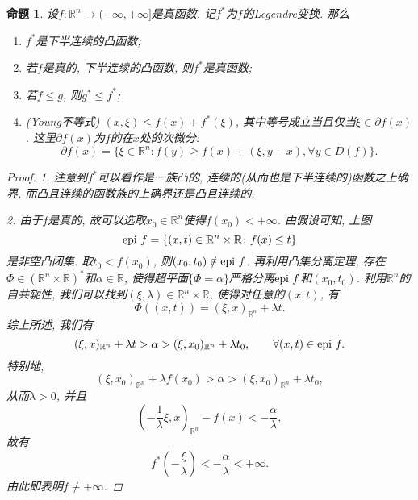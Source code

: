 \documentclass[12pt,a4paper]{article}
\newtheorem{proposition}[theorem]{命题}
\begin{document}
\begin{proposition}
    设$f\colon \mathbb{R}^n \rightarrow (-\infty, +\infty]$是真函数. 记$f^*$为$f$的Legendre变换.
    那么 
    \begin{enumerate}
        \item $f^*$是下半连续的凸函数;
        \item 若$f$是真的, 下半连续的凸函数, 则$f^*$是真函数;
        \item 若$f \leq g$, 则$g^* \leq f^*$; \label{prop2.63-3}
        \item (Young不等式) $(x, \xi) \leq f(x) + f^*(\xi)$, 其中等号成立当且仅当$\xi \in \partial f(x)$. \label{prop2.63-4}
        这里$\partial f(x)$为$f$的在$x$处的次微分:
        \begin{equation*}
            \partial f(x) = \{\xi \in \mathbb{R}^n\colon f(y) \geq f(x) + (\xi, y - x), \forall y \in D(f)\}.
        \end{equation*}
    \end{enumerate}
    \begin{proof}
        1. 注意到$f^*$可以看作是一族凸的, 连续的(从而也是下半连续的)函数之上确界, 而凸且连续的函数族的上确界还是凸且连续的.

        2. 由于$f$是真的, 故可以选取$x_0 \in \mathbb{R}^n$使得$f(x_0) < +\infty$.
        由假设可知, 上图
        \begin{equation*}
            {\rm epi}\ f = \{(x, t) \in \mathbb{R}^n \times \mathbb{R}\colon f(x) \leq t\}
        \end{equation*}
        是非空凸闭集. 取$t_0 < f(x_0)$, 则$(x_0, t_0) \notin {\rm epi}\ f$. 再利用凸集分离定理, 存在$\Phi \in (\mathbb{R}^n \times \mathbb{R})^*$和$\alpha \in \mathbb{R}$, 使得超平面$\{\Phi = \alpha\}$严格分离${\rm epi}\ f$和$(x_0, t_0)$.
        利用$\mathbb{R}^n$的自共轭性, 我们可以找到$(\xi, \lambda) \in \mathbb{R}^n \times \mathbb{R}$, 使得对任意的$(x, t)$, 有 
        \begin{equation*}
            \Phi((x, t)) = (\xi, x)_{\mathbb{R}^n} + \lambda t.
        \end{equation*}
        综上所述, 我们有 
        \begin{equation*}
            (\xi, x)_{\mathbb{R}^n} + \lambda t > \alpha > (\xi, x_0)_{\mathbb{R}^n} + \lambda t_0, \qquad \forall (x, t) \in {\rm epi}\ f.
        \end{equation*}
        特别地, 
        \begin{equation*}
            (\xi, x_0)_{\mathbb{R}^n} + \lambda f(x_0) > \alpha > (\xi, x_0)_{\mathbb{R}^n} + \lambda t_0,
        \end{equation*}
        从而$\lambda > 0$, 并且 
        \begin{equation*}
            \left(-\frac{1}{\lambda}\xi, x\right)_{\mathbb{R}^n} - f(x) < -\frac{\alpha}{\lambda},
        \end{equation*}
        故有 
        \begin{equation*}
            f^*\left(-\frac{\xi}{\lambda}\right) < -\frac{\alpha}{\lambda} < +\infty.
        \end{equation*}
        由此即表明$f \not\equiv +\infty$.
    

\end{proof}
\end{proposition}
\end{document}
